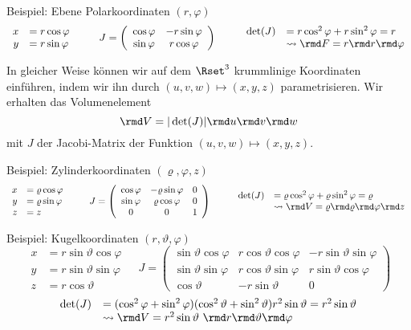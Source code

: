 \documentclass[a4paper,10pt]{article}
\begin{document}
Beispiel: Ebene Polarkoordinaten $(r,\varphi)$
\[
\begin{array}{rl}x &= r\cos\varphi\\y &= r\sin\varphi\end{array}~~~~~~~
J = \left(\begin{array}{cc}\cos\varphi&-r\sin\varphi\\\sin\varphi&r\cos\varphi\end{array}\right)~~~~~~~
\begin{array}{rl}
\det(J) &= r\cos^2\varphi+r\sin^2\varphi=r\\
        &\leadsto \rmd F = r\rmd r\rmd\varphi
\end{array}
\]

In gleicher Weise können wir auf dem $\Rset^3$ krummlinige Koordinaten
einführen, indem wir ihn durch $(u,v,w)\mapsto (x,y,z)$ parametrisieren.
Wir erhalten das Volumenelement
\[
\rmd V = |\det(J)|\rmd u\rmd v\rmd w
\]
mit $J$ der Jacobi-Matrix der Funktion $(u,v,w)\mapsto (x,y,z)$.

Beispiel:
Zylinderkoordinaten $(\varrho,\varphi,z)$
\[\begin{array}{rl}
x &= \varrho\cos\varphi\\
y &= \varrho\sin\varphi\\
z &= z
\end{array}~~~~~~~
J=\left(\begin{array}{ccc}
\cos\varphi&-\varrho\sin\varphi&0\\
\sin\varphi&\varrho\cos\varphi&0\\
0&0&1
\end{array}\right)~~~~~~~
\begin{array}{rl}
\det(J) &= \varrho\cos^2\varphi+\varrho\sin^2\varphi=\varrho\\
        &\leadsto \rmd V = \varrho\rmd \varrho\rmd\varphi\rmd z
\end{array}
\]

Beispiel: Kugelkoordinaten $(r,\vartheta,\varphi)$
\[\begin{array}{rl}
x &= r\sin\vartheta\cos\varphi\\
y &= r\sin\vartheta\sin\varphi\\
z &= r\cos\vartheta
\end{array}~~~~~
J=\left(\begin{array}{ccc}
\sin\vartheta\cos\varphi&r\cos\vartheta\cos\varphi&-r\sin\vartheta\sin\varphi\\
\sin\vartheta\sin\varphi&r\cos\vartheta\sin\varphi&r\sin\vartheta\cos\varphi\\
\cos\vartheta&-r\sin\vartheta&0
\end{array}\right)
\]\[
\begin{array}{rl}
\det(J) &= (\cos^2\varphi+\sin^2\varphi)(\cos^2\vartheta+\sin^2\vartheta)r^2\sin\vartheta=r^2\sin\vartheta\\
        &\leadsto \rmd V = r^2\sin\vartheta~\rmd r\rmd\vartheta\rmd\varphi
\end{array}
\]
\end{document}
